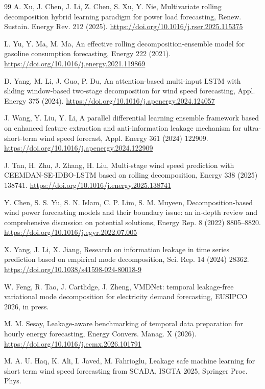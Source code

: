\documentclass[review,3p,times]{elsarticle}
\begin{document}
\begin{thebibliography}{99}
A. Xu, J. Chen, J. Li, Z. Chen, S. Xu, Y. Nie,
Multivariate rolling decomposition hybrid learning paradigm for power load
forecasting,
Renew. Sustain. Energy Rev. 212 (2025).
\url{https://doi.org/10.1016/j.rser.2025.115375}

L. Yu, Y. Ma, M. Ma,
An effective rolling decomposition-ensemble model for gasoline consumption
forecasting,
Energy 222 (2021).
\url{https://doi.org/10.1016/j.energy.2021.119869}

D. Yang, M. Li, J. Guo, P. Du,
An attention-based multi-input LSTM with sliding window-based two-stage
decomposition for wind speed forecasting,
Appl. Energy 375 (2024).
\url{https://doi.org/10.1016/j.apenergy.2024.124057}

J. Wang, Y. Liu, Y. Li,
A parallel differential learning ensemble framework based on enhanced feature
extraction and anti-information leakage mechanism for ultra-short-term wind
speed forecast,
Appl. Energy 361 (2024) 122909.
\url{https://doi.org/10.1016/j.apenergy.2024.122909}

J. Tan, H. Zhu, J. Zhang, H. Liu,
Multi-stage wind speed prediction with CEEMDAN-SE-IDBO-LSTM based on rolling
decomposition,
Energy 338 (2025) 138741.
\url{https://doi.org/10.1016/j.energy.2025.138741}

Y. Chen, S. S. Yu, S. N. Islam, C. P. Lim, S. M. Muyeen,
Decomposition-based wind power forecasting models and their boundary issue: an
in-depth review and comprehensive discussion on potential solutions,
Energy Rep. 8 (2022) 8805--8820.
\url{https://doi.org/10.1016/j.egyr.2022.07.005}

X. Yang, J. Li, X. Jiang,
Research on information leakage in time series prediction based on empirical
mode decomposition,
Sci. Rep. 14 (2024) 28362.
\url{https://doi.org/10.1038/s41598-024-80018-9}

W. Feng, R. Tao, J. Cartlidge, J. Zheng,
VMDNet: temporal leakage-free variational mode decomposition for electricity
demand forecasting, EUSIPCO 2026, in press.

M. M. Sesay,
Leakage-aware benchmarking of temporal data preparation for hourly energy
forecasting,
Energy Convers. Manag. X (2026).
\url{https://doi.org/10.1016/j.ecmx.2026.101791}

M. A. U. Haq, K. Ali, I. Javed, M. Fahrioglu,
Leakage safe machine learning for short term wind speed forecasting from SCADA,
ISGTA 2025, Springer Proc. Phys.


\end{thebibliography}
\end{document}
